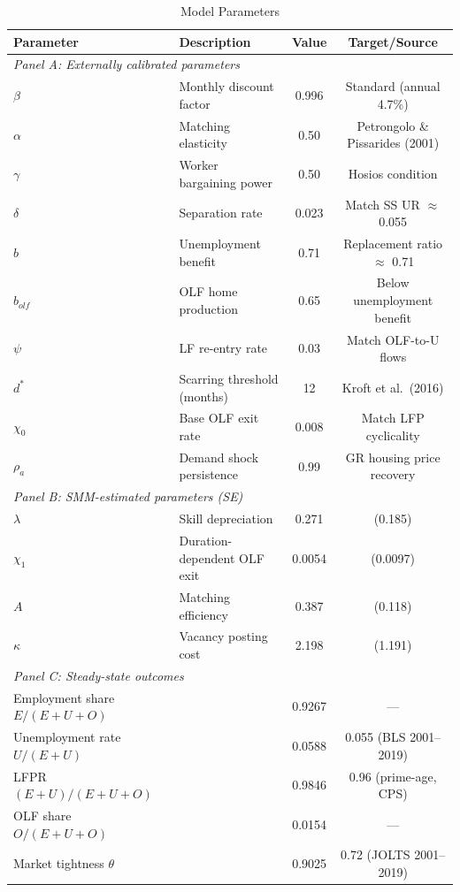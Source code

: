\begin{table}[H]
\centering
\caption{Model Parameters}
\begin{threeparttable}
\begin{tabular}{llcc}
\toprule
Parameter & Description & Value & Target/Source \\
\midrule
\multicolumn{4}{l}{\textit{Panel A: Externally calibrated parameters}} \\[3pt]
$\beta$ & Monthly discount factor & 0.996 & Standard (annual 4.7\%) \\
$\alpha$ & Matching elasticity & 0.50 & Petrongolo \& Pissarides (2001) \\
$\gamma$ & Worker bargaining power & 0.50 & Hosios condition \\
$\delta$ & Separation rate & 0.023 & Match SS UR $\approx$ 0.055 \\
$b$ & Unemployment benefit & 0.71 & Replacement ratio $\approx$ 0.71 \\
$b_{olf}$ & OLF home production & 0.65 & Below unemployment benefit \\
$\psi$ & LF re-entry rate & 0.03 & Match OLF-to-U flows \\
$d^*$ & Scarring threshold (months) & 12 & Kroft et al.\ (2016) \\
$\chi_0$ & Base OLF exit rate & 0.008 & Match LFP cyclicality \\
$\rho_a$ & Demand shock persistence & 0.99 & GR housing price recovery \\
\midrule
\multicolumn{4}{l}{\textit{Panel B: SMM-estimated parameters (SE)}} \\[3pt]
$\lambda$ & Skill depreciation & 0.271 & (0.185) \\
$\chi_1$ & Duration-dependent OLF exit & 0.0054 & (0.0097) \\
$A$ & Matching efficiency & 0.387 & (0.118) \\
$\kappa$ & Vacancy posting cost & 2.198 & (1.191) \\
\midrule
\multicolumn{4}{l}{\textit{Panel C: Steady-state outcomes}} \\[3pt]
Employment share $E/(E+U+O)$ & & 0.9267 & --- \\
Unemployment rate $U/(E+U)$ & & 0.0588 & 0.055 (BLS 2001--2019) \\
LFPR $(E+U)/(E+U+O)$ & & 0.9846 & 0.96 (prime-age, CPS) \\
OLF share $O/(E+U+O)$ & & 0.0154 & --- \\
Market tightness $\theta$ & & 0.9025 & 0.72 (JOLTS 2001--2019) \\

\end{tabular}
\end{threeparttable}
\end{table}
